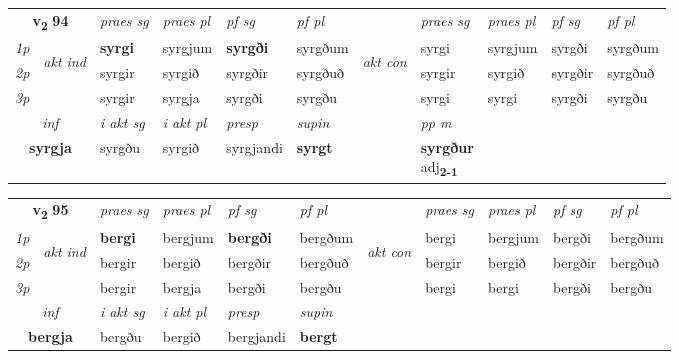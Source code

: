 \noindent
\begin{tabular}{lllllllllll} \toprule
\multicolumn{2}{c}{\textbf{v{\textsubscript{2}}} \Large{\textbf{94}}}  &  \textit{praes sg}  & \textit{praes pl}  &\textit{ pf sg} & \textit{pf pl} &  &  \textit{praes sg}  & \textit{praes pl}  & \textit{pf sg} & \textit{pf pl } \\*
	\cmidrule{3-6} \cmidrule{8-11}
 {\textit{1p}} & \multirow{3}{*}{\begin{turn}{90}\textit{akt ind}\end{turn}} & \textbf{syrgi} & syrgjum & \textbf{syrgði} & syrgðum & \multirow{3}{*}{\begin{turn}{90}\textit{akt con}\end{turn}} &syrgi & syrgjum & syrgði & syrgðum\\*
 {\textit{2p}} &  &  syrgir  & syrgið & syrgðir & syrgðuð & & syrgir & syrgið & syrgðir & syrgðuð \\*
{\textit{3p}} &  & syrgir & syrgja & syrgði & syrgðu & & syrgi & syrgi& syrgði & syrgðu \\*
\cmidrule{3-6} \cmidrule{8-11}

   \multicolumn{2}{c}{\textit{inf}}  & \textit{i akt sg} & \textit{i akt pl}   & \textit{presp} & \textit{supin}  && \textit{pp m} \\*
  \multicolumn{2}{c}{\textbf{syrgja}} & syrgðu  & syrgið   & syrgjandi &  \textbf{syrgt}  && \specialcell{\textbf{syrgður} \\ adj\textbf{\textsubscript{2-1}}} \\*
\end{tabular}

\noindent
\begin{tabular}{lllllllllll} \toprule
\multicolumn{2}{c}{\textbf{v{\textsubscript{2}}} \Large{\textbf{95}}}  &  \textit{praes sg}  & \textit{praes pl}  &\textit{ pf sg} & \textit{pf pl} &  &  \textit{praes sg}  & \textit{praes pl}  & \textit{pf sg} & \textit{pf pl } \\*
	\cmidrule{3-6} \cmidrule{8-11}
 {\textit{1p}} & \multirow{3}{*}{\begin{turn}{90}\textit{akt ind}\end{turn}} & \textbf{bergi} & bergjum & \textbf{bergði} & bergðum & \multirow{3}{*}{\begin{turn}{90}\textit{akt con}\end{turn}} &bergi & bergjum & bergði & bergðum\\*
 {\textit{2p}} &  &  bergir  & bergið & bergðir & bergðuð & & bergir & bergið & bergðir & bergðuð \\*
{\textit{3p}} &  & bergir & bergja & bergði & bergðu & & bergi & bergi& bergði & bergðu \\*
\cmidrule{3-6} \cmidrule{8-11}

   \multicolumn{2}{c}{\textit{inf}}  & \textit{i akt sg} & \textit{i akt pl}   & \textit{presp} & \textit{supin}   \\*
  \multicolumn{2}{c}{\textbf{bergja}} & bergðu  & bergið   & bergjandi &  \textbf{bergt}   \\*
\end{tabular}

